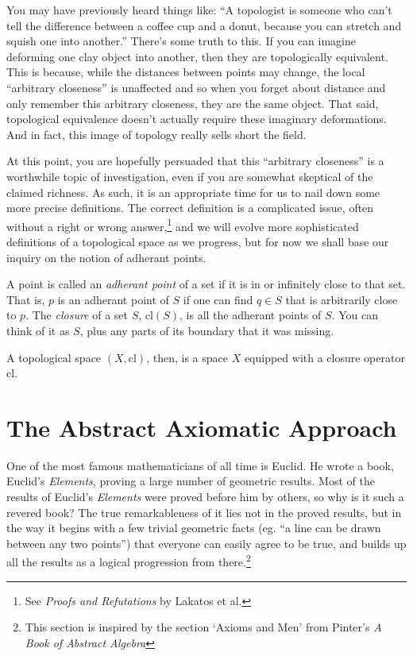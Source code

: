 \documentclass{report}
\newcommand{\cl}{\mathrm{cl}}
\begin{document}
You may have previously heard things like: ``A topologist is someone who can't tell the difference between a coffee cup and a donut, because you can stretch and squish one into another.'' There's some truth to this. If you can imagine deforming one clay object into another, then they are topologically equivalent. This is because, while the distances between points may change, the local ``arbitrary closeness'' is unaffected and so when you forget about distance and only remember this arbitrary closeness, they are the same object. That said, topological equivalence doesn't actually require these imaginary deformations. And in fact, this image of topology really sells short the field.

At this point, you are hopefully persuaded that this ``arbitrary closeness'' is a worthwhile topic of investigation, even if you are somewhat skeptical of the claimed richness. As such, it is an appropriate time for us to nail down some more precise definitions. The correct definition is a complicated issue, often without a right or wrong answer,\footnote{See \emph{Proofs and Refutations} by Lakatos et al.} and we will evolve more sophisticated definitions of a topological space as we progress, but for now we shall base our inquiry on the notion of adherant points.

A point is called an \emph{adherant point} of a set if it is in or infinitely close to that set. That is, $p$ is an adherant point of $S$ if one can find $q ∈ S$ that is arbitrarily close to $p$. The \emph{closure} of a set $S$, $\cl(S)$, is all the adherant points of $S$. You can think of it as $S$, plus any parts of its boundary that it was missing.

A topological space $(X, \cl)$, then, is a space $X$ equipped with a closure operator $\cl$.

\section{The Abstract Axiomatic Approach}

One of the most famous mathematicians of all time is Euclid. He wrote a book, Euclid's \emph{Elements}, proving a large number of geometric results. Most of the results of Euclid's \emph{Elements} were proved before him by others, so why is it such a revered book? The true remarkableness of it lies not in the proved results, but in the way it begins with a few trivial geometric facts (eg. ``a line can be drawn between any two points'') that everyone can easily agree to be true, and builds up all the results as a logical progression from there.\footnote{This section is inspired by the section `Axioms and Men' from Pinter's \emph{A Book of Abstract Algebra}}
\end{document}

